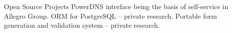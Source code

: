 \begin{rubric}{Open Source Projects}
PowerDNS interface being the basis of \hbox{self-service} in Allegro Group.
ORM for PostgreSQL -- private research.
Portable form generation and validation system -- private research.
\end{rubric}
